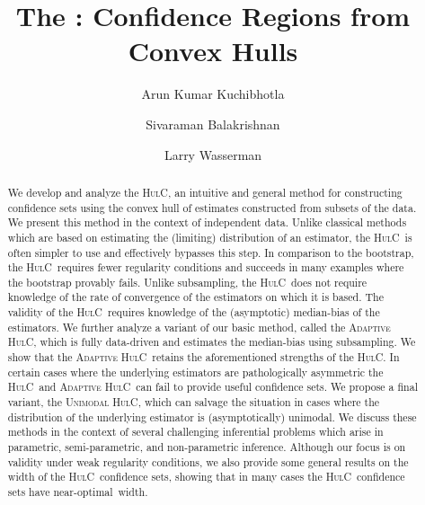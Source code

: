 \documentclass{article}
\title{\bf The \hulcnospace: Confidence Regions from Convex Hulls}
\author{Arun Kumar Kuchibhotla}
\author{Sivaraman Balakrishnan}
\author{Larry Wasserman}
\affil{\texttt{\{arunku,\,siva,\,larry\}@stat.cmu.edu}}
\affil{Department of Statistics \& Data Science, Carnegie Mellon University,\\ 5000 Forbes Ave, Pittsburgh, PA 15213, USA.}
\date{}
\newcommand{\hulc}{\textsc{HulC}~}
\newcommand{\hulcnospace}{\textsc{HulC}}
\newcommand{\ahulc}{\textsc{Adaptive HulC}~}
\newcommand{\ahulcnospace}{\textsc{Adaptive HulC}}
\newcommand{\uhulcnospace}{\textsc{Unimodal HulC}}
\numberwithin{myalgctr}{section}
\begin{document}
\maketitle

\begin{abstract}
We develop and analyze the \hulcnospace, an intuitive and general method for constructing confidence sets using the convex hull 
of estimates constructed from subsets of the data. 
{\color{black}We present this method in the context of independent data.}
Unlike classical methods which are based on estimating the (limiting) distribution of an estimator, the \hulc is often 
simpler to use and effectively bypasses this step.
In comparison to the bootstrap, the \hulc requires fewer regularity conditions and succeeds in many examples where the bootstrap 
provably fails. Unlike subsampling, the \hulc does not require knowledge of the rate of convergence of the estimators on which it is based. 
The validity of the \hulc requires knowledge of the (asymptotic) median-bias of the estimators. We further analyze 
a variant of our basic method, 
called the \ahulcnospace, which is fully data-driven and estimates the median-bias using subsampling. We show that the \ahulc retains the aforementioned
strengths of the \hulcnospace. In certain cases where the underlying estimators are pathologically asymmetric the \hulc and \ahulc can fail to provide useful confidence sets. 
We propose a final variant, the \uhulcnospace, which can salvage the situation in cases where the distribution of the underlying estimator is (asymptotically) unimodal. 
We discuss these methods in the context of several challenging inferential problems which arise
in parametric, semi-parametric, and non-parametric inference. Although our focus is on validity under weak regularity conditions, we
also provide some general results on the width of the \hulc confidence sets, showing that in many
cases the \hulc confidence sets have near-optimal~width.
\end{abstract}
\end{document}

